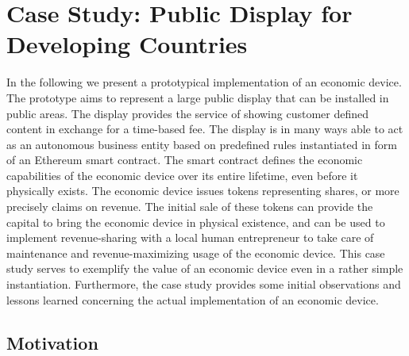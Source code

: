 

\section{Case Study: Public Display for Developing Countries}
\label{sec:caseDisplay}

In the following we present a prototypical implementation of an economic device. The prototype aims to represent a large public display that can be installed in public areas. The display provides the service of showing customer defined content in exchange for a time-based fee. The display is in many ways able to act as an autonomous business entity based on predefined rules instantiated in form of an Ethereum smart contract. The smart contract defines the economic capabilities of the economic device over its entire lifetime, even before it physically exists. The economic device issues tokens representing shares, or more precisely claims on revenue. The initial sale of these tokens can provide the capital to bring the economic device in physical existence, and can be used to implement revenue-sharing with a local human entrepreneur to take care of maintenance and revenue-maximizing usage of the economic device. This case study serves to exemplify the value of an economic device even in a rather simple instantiation. Furthermore, the case study provides some initial observations and lessons learned concerning the actual implementation of an economic device.

\subsection{Motivation}

